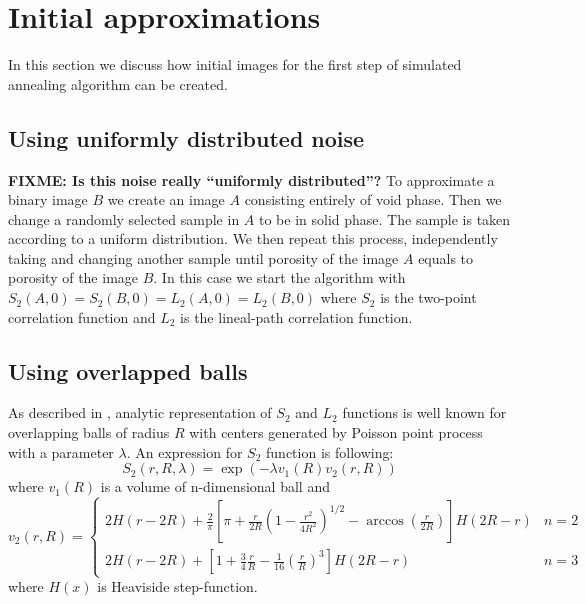 \documentclass[preprint,amsmath,amssymb,aps,pre,nofootinbib]{revtex4-1}
\begin{document}
\section{Initial approximations}
\label{sec:init}
In this section we discuss how initial images for the first step of simulated
annealing algorithm can be created.
\subsection{Using uniformly distributed noise}
\label{sec:init-uniform}
\textbf{FIXME: Is this noise really ``uniformly distributed''?}
To approximate a binary image $B$ we create an image $A$ consisting entirely of
void phase. Then we change a randomly selected sample in $A$ to be in solid
phase. The sample is taken according to a uniform distribution. We then repeat
this process, independently taking and changing another sample until porosity of
the image $A$ equals to porosity of the image $B$. In this case we start the
algorithm with $S_2(A, 0) = S_2(B, 0) = L_2(A, 0) = L_2(B, 0)$ where $S_2$ is
the two-point correlation function and $L_2$ is the lineal-path correlation
function.
\subsection{Using overlapped balls}
\label{sec:init-balls}
As described in \cite{torq-book}, analytic representation of $S_2$ and $L_2$
functions is well known for overlapping balls of radius $R$ with centers
generated by Poisson point process with a parameter $\lambda$. An expression for
$S_2$ function is following:
\begin{equation}
  S_2(r, R, \lambda) = \exp(-\lambda v_1(R) v_2(r, R)) \label{eq:s2-balls}
\end{equation}
where $v_1(R)$ is a volume of n-dimensional ball and
\begin{equation*}
  v_2(r, R) =
  \begin{cases}
    2H(r - 2R) + \frac{2}{\pi}[\pi + \frac{r}{2R}(1 - \frac{r^2}{4R^2})^{1/2} -
      \arccos(\frac{r}{2R})]H(2R-r) & n = 2 \\
    2H(r - 2R) + [1 + \frac{3}{4}\frac{r}{R} - \frac{1}{16}(\frac{r}{R})^3]H(2R
    - r) & n = 3
  \end{cases}
\end{equation*}
where $H(x)$ is Heaviside step-function.
\end{document}

